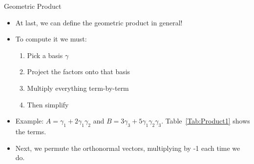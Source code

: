 \documentclass[aspectratio=169,xcolor=dvipsnames]{beamer}
\begin{document}



\begin{frame}{Geometric Product}


\begin{itemize}
      \item<only@1> At last, we can define the geometric product in general!
      \item<only@1> To compute it we must:
            \begin{enumerate}
                  \item Pick a basis $\gamma$
                  \item Project the factors onto that basis
                  \item Multiply everything term-by-term
                  \item Then simplify
            \end{enumerate}
      \item<only@1> Example: $A = \gamma_1 + 2\gamma_1\gamma_2$ and $B = 3\gamma_3 +5\gamma_1\gamma_2\gamma_3$.
            Table~\ref{Tab:Product1} shows the terms.
\setcounter{table}{2}
      \item<2> Next, we permute the orthonormal vectors, multiplying by -1 each time we do.




\end{itemize}
\end{frame}
\end{document}
